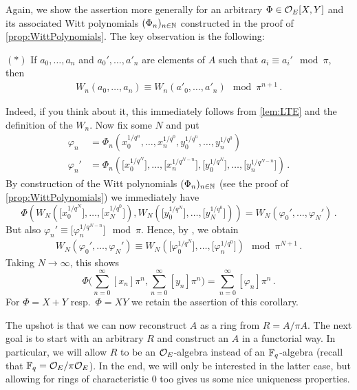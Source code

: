 \begin{proof*}
	Again, we show the assertion more generally for an arbitrary $\Phi\in\mathcal{O}_E[X,Y]$ and its associated Witt polynomials $(\Phi_n)_{n\in\mathbb{N}}$ constructed in the proof of \cref{prop:WittPolynomials}. The key observation is the following:
	\begin{alphanumerate}
		\item[$(*)$] If $a_0,\dotsc,a_n$ and $a_0',\dotsc,a'_n$ are elements of $A$ such that $a_i\equiv a_i'\mod \pi$, then
		\begin{align*}
			W_n(a_0,\dotsc,a_n)\equiv W_n(a'_0,\dotsc,a'_n)\mod \pi^{n+1}\,.
		\end{align*}
	\end{alphanumerate}
	Indeed, if you think about it, this immediately follows from \cref{lem:LTE} and the definition of the $W_n$. Now fix some $N$ and put
	\begin{align*}
		\varphi_n&=\Phi_n\left(x_0^{1/q^n},\dotsc,x_n^{1/q^0},y_0^{1/q^n},\dotsc,y_n^{1/q^0}\right)\\
		\varphi_n'&=\Phi_n\left(\big[x_0^{1/q^N}\big],\dotsc,\big[x_n^{1/q^{N-n}}\big],\big[y_0^{1/q^N}\big],\dotsc,\big[y_n^{1/q^{N-n}}\big]\right)\,.
	\end{align*}
	By construction of the Witt polynomials $(\Phi_n)_{n\in\mathbb{N}}$ (see the proof of \cref{prop:WittPolynomials}) we immediately have 
	\begin{equation*}
		\Phi\left(W_N\left(\big[x_0^{1/q^N}\big],\dotsc,\big[x_N^{1/q^0}\big]\right),W_N\left(\big[y_0^{1/q^N}\big],\dotsc,\big[y_N^{1/q^0}\big]\right)\right)= W_N(\varphi_0',\dotsc,\varphi_N')\,.
	\end{equation*}
	But also $\varphi_n'\equiv\big[\varphi_n^{1/q^{N-n}}\big]\mod \pi$. Hence, by \itememph{*}, we obtain
	\begin{align*}
		W_N(\varphi_0',\dotsc,\varphi_N')\equiv W_N\left(\big[\varphi_0^{1/q^N}\big],\dotsc,\big[\varphi_n^{1/q^{0}}\big]\right)\mod \pi^{N+1}\,.
	\end{align*}
	Taking $N\rightarrow\infty$, this shows
	\begin{equation*}
		\Phi\Bigg(\sum_{n=0}^\infty[x_n]\pi^n,\sum_{n=0}^\infty[y_n]\pi^n\Bigg)=\sum_{n=0}^\infty[\varphi_n]\pi^n\,.
	\end{equation*}
	For $\Phi=X+Y$ resp.\ $\Phi=XY$ we retain the assertion of this corollary.
\end{proof*}
The upshot is that we can now reconstruct $A$ as a ring from $R=A/\pi A$. The next goal is to start with an arbitrary $R$ and construct an $A$ in a functorial way. In particular, we will allow $R$ to be an $\mathcal{O}_E$-algebra instead of an $\mathbb{F}_q$-algebra (recall that $\mathbb{F}_q=\mathcal{O}_E/\pi\mathcal{O}_E$). In the end, we will only be interested in the latter case, but allowing for rings of characteristic $0$ too gives us some nice uniqueness properties.
